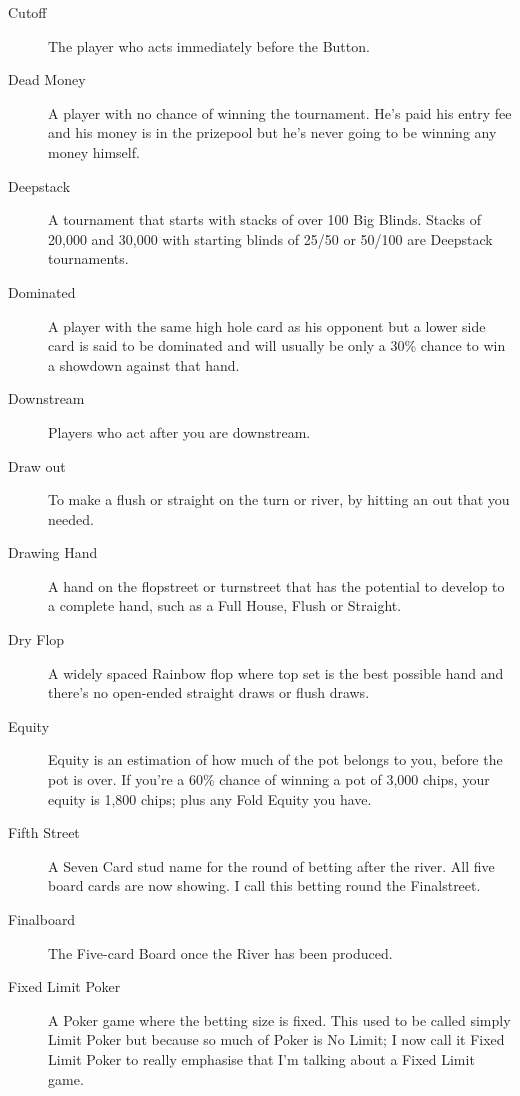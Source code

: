 \begin{description}
\item[Cutoff] The player who acts immediately before the Button.

\item[Dead Money] A player with no chance of winning the tournament.
He's paid his entry fee and his money is in the prizepool but he's
never going to be winning any money himself.

\item[Deepstack] A tournament that starts with stacks of over 100 Big
Blinds. Stacks of 20,000 and 30,000 with starting blinds of 25/50 or
50/100 are Deepstack tournaments.

\item[Dominated] A player with the same high hole card as his opponent
but a lower side card is said to be dominated and will usually be
only a 30\% chance to win a showdown against that hand.

\item[Downstream] Players who act after you are downstream.

\item[Draw out] To make a flush or straight on the turn or river, by
hitting an out that you needed.

\item[Drawing Hand] A hand on the flopstreet or turnstreet that has
the potential to develop to a complete hand, such as a Full House,
Flush or Straight.

\item[Dry Flop] A widely spaced Rainbow flop where top set is the best
possible hand and there's no open-ended straight draws or flush
draws.

\item[Equity] Equity is an estimation of how much of the pot belongs
to you, before the pot is over. If you're a 60\% chance of winning a
pot of 3,000 chips, your equity is 1,800 chips; plus any Fold Equity
you have.

\item[Fifth Street] A Seven Card stud name for the round of betting
after the river. All five board cards are now showing. I call this betting
round the Finalstreet.

\item[Finalboard] The Five-card Board once the River has been
produced.

\item[Fixed Limit Poker] A Poker game where the betting size is
fixed. This used to be called simply Limit Poker but because so much
of Poker is No Limit; I now call it Fixed Limit Poker to really
emphasise that I'm talking about a Fixed Limit game.


\end{description}
